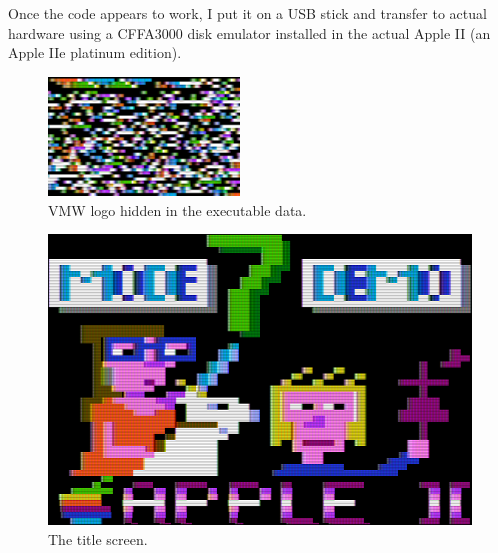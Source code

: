 \documentclass[twocolumn]{article}
\begin{document}
Once the code appears to work, I put it on a USB stick and transfer
to actual hardware using a CFFA3000 disk emulator installed in
the actual Apple II (an Apple IIe platinum edition).

%




\begin{figure}[tb]
\begin{center}
\includegraphics[width=2in]{figures/hidden_vmw.png}
\end{center}
\caption{VMW logo hidden in the executable data.\label{fig:vmw}}
\end{figure}

\begin{figure}[tb]
\begin{center}
\includegraphics[width=\columnwidth]{figures/mode7_demo_title.png}
\end{center}
\caption{The title screen.\label{fig:title}}
\end{figure}
\end{document}
